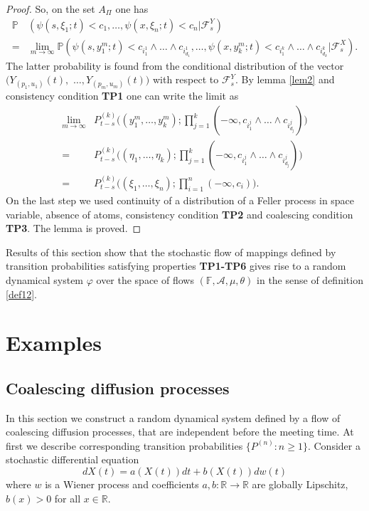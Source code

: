\documentclass[a4paper,12pt]{article}
\newcommand{\1}{1\!\!\,{\rm I}}
\theoremstyle{plain}
\begin{document}
\begin{proof}
	So, on the set $A_\Pi$ one has
	$$
	\begin{aligned}
	\mathbb{P}& (\psi(s,\xi_1;t)<c_1,\ldots,\psi(x,\xi_n;t)<c_n|\mathcal{F}^Y_s) \\
	=& \lim_{m\to\infty}\mathbb{P}(\psi(s,y^m_1;t)<c_{i^1_1}\wedge\ldots\wedge c_{i^1_{d_1}},\ldots,\psi(x,y^m_k;t)<c_{i^k_1}\wedge\ldots\wedge c_{i^k_{d_k}}|\mathcal{F}^X_s).
	\end{aligned}
	$$
	The latter probability is found from the conditional distribution of the vector $(Y_{(p_1,u_1)}(t),$ $\ldots,Y_{(p_m,u_m)}(t))$ with respect to $\mathcal{F}^Y_s.$ By lemma \ref{lem2} and consistency condition {\bf TP1} one can write the limit as 
	$$
	\begin{aligned}
	\lim_{m\to\infty} & P^{(k)}_{t-s}\bigg((y^m_1,\ldots,y^m_k);\prod^k_{j=1}(-\infty,c_{i^j_1}\wedge\ldots\wedge c_{i^j_{d_j}})\bigg) \\
	= & P^{(k)}_{t-s}\bigg((\eta_1,\ldots,\eta_k);\prod^k_{j=1}(-\infty,c_{i^j_1}\wedge\ldots\wedge c_{i^j_{d_j}})\bigg) \\
	= & P^{(k)}_{t-s}\bigg((\xi_1,\ldots,\xi_n);\prod^n_{i=1}(-\infty,c_i)\bigg).
	\end{aligned}
	$$
	On the last step we used continuity of a distribution of a Feller process in space variable, absence of atoms, consistency condition {\bf TP2} and coalescing condition {\bf TP3}. The lemma is proved.
\end{proof}

Results of this section show that the stochastic flow of mappings defined by transition probabilities satisfying properties {\bf TP1-TP6} gives rise to a random dynamical  system $\varphi$ over the space of flows $(\mathbb{F},\mathcal{A},\mu,\theta)$  in the sense of definition \ref{def12}.


\section{Examples}


\subsection{Coalescing diffusion processes}

In this section we construct a random dynamical system defined by a flow of coalescing diffusion processes, that are independent before the meeting time. At first we describe corresponding transition probabilities $\{P^{(n)}:n\geq 1\}.$ Consider a stochastic differential equation
\begin{equation}
\label{eq04_5}
dX(t)=a(X(t))dt+b(X(t))dw(t)
\end{equation}
where $w$ is a Wiener process and coefficients $a,b:\mathbb{R}\to\mathbb{R}$ are globally Lipschitz,  $b(x)>0$  for all $x\in\mathbb{R}.$
\end{document}
